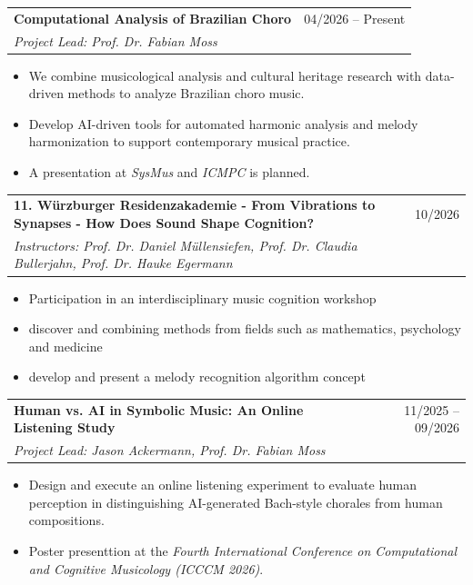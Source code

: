 \documentclass[11pt,a4paper]{article}
\begin{document}
\noindent
\begin{tabularx}{\textwidth}{@{} X r @{}}
\textbf{Computational Analysis of Brazilian Choro} & 04/2026 -- Present \\
\textit{Project Lead: Prof. Dr. Fabian Moss} & 
\end{tabularx}
\vspace{-0.2cm}
\begin{itemize} \itemsep -2pt
    \item We combine musicological analysis and cultural heritage research with data-driven methods to analyze Brazilian choro music.
    \item Develop AI-driven tools for automated harmonic analysis and melody harmonization to support contemporary musical practice.
    \item A presentation at \textit{SysMus} and \textit{ICMPC} is planned.
\end{itemize}
\begin{tabularx}{\textwidth}{@{} X r @{}}
\textbf{11. Würzburger Residenzakademie - From Vibrations to Synapses - How Does Sound Shape Cognition?} & 10/2026 \\
\textit{Instructors: Prof. Dr. Daniel Müllensiefen, Prof. Dr. Claudia Bullerjahn, Prof. Dr. Hauke Egermann} & 
\end{tabularx}
\vspace{-0.2cm}
\begin{itemize} \itemsep -2pt
    \item Participation in an interdisciplinary music cognition workshop
    \item discover and combining methods from fields such as mathematics, psychology and medicine
    \item develop and present a melody recognition algorithm concept
\end{itemize}
\begin{tabularx}{\textwidth}{@{} X r @{}}
\textbf{Human vs. AI in Symbolic Music: An Online Listening Study} & 11/2025 -- 09/2026 \\
\textit{Project Lead: Jason Ackermann, Prof. Dr. Fabian Moss} & 
\end{tabularx}
\vspace{-0.2cm}
\begin{itemize} \itemsep -2pt
    \item Design and execute an online listening experiment to evaluate human perception in distinguishing AI-generated Bach-style chorales from human compositions.
    \item Poster presenttion at the \textit{Fourth International Conference on Computational and Cognitive Musicology (ICCCM 2026)}.
\end{itemize}
\end{document}
